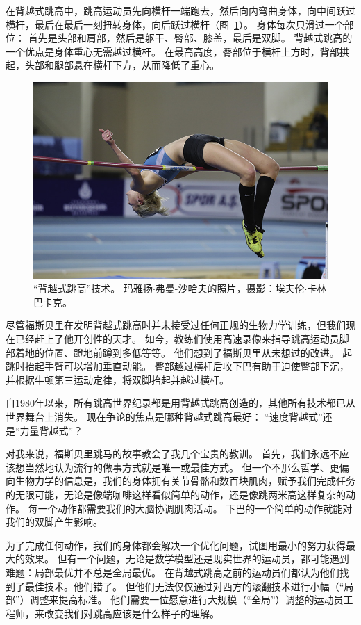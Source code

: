 在背越式跳高中，跳高运动员先向横杆一端跑去，然后向内弯曲身体，向中间跃过横杆，最后在最后一刻扭转身体，向后跃过横杆（图~\ref{fig:9_1}）。
身体每次只滑过一个部位：
首先是头部和肩部，然后是躯干、臀部、膝盖，最后是双脚。
背越式跳高的一个优点是身体重心无需越过横杆。
在最高高度，臀部位于横杆上方时，背部拱起，头部和腿部悬在横杆下方，从而降低了重心。


\begin{figure}[!htb]
	\centering
	\includegraphics[width=1.0\linewidth]{chap9/9_1}
	\caption{“背越式跳高”技术。
		玛雅扬$\cdot$弗曼-沙哈夫的照片，摄影：埃夫伦$\cdot$卡林巴卡克。 \label{fig:9_1}}
\end{figure}


尽管福斯贝里在发明背越式跳高时并未接受过任何正规的生物力学训练，但我们现在已经赶上了他开创性的天才。
如今，教练们使用高速录像来指导跳高运动员脚部着地的位置、蹬地前蹲到多低等等。
他们想到了福斯贝里从未想过的改进。
起跳时抬起手臂可以增加垂直动能。
臀部越过横杆后收下巴有助于迫使臀部下沉，并根据牛顿第三运动定律，将双脚抬起并越过横杆。


自1980年以来，所有跳高世界纪录都是用背越式跳高创造的，其他所有技术都已从世界舞台上消失。
现在争论的焦点是哪种背越式跳高最好：
“速度背越式”还是“力量背越式”？


对我来说，福斯贝里跳马的故事教会了我几个宝贵的教训。
首先，我们永远不应该想当然地认为流行的做事方式就是唯一或最佳方式。
但一个不那么哲学、更偏向生物力学的信息是，我们的身体拥有关节骨骼和数百块肌肉，赋予我们完成任务的无限可能，无论是像端咖啡这样看似简单的动作，还是像跳两米高这样复杂的动作。
每一个动作都需要我们的大脑协调肌肉活动。
下巴的一个简单的动作就能对我们的双脚产生影响。


为了完成任何动作，我们的身体都会解决一个优化问题，试图用最小的努力获得最大的效果。
但有一个问题，无论是数学模型还是现实世界的运动员，都可能遇到难题：局部最优并不总是全局最优。
在背越式跳高之前的运动员们都认为他们找到了最佳技术。他们错了。
但他们无法仅仅通过对西方的滚翻技术进行小幅（“局部”）调整来提高标准。
他们需要一位愿意进行大规模（“全局”）调整的运动员工程师，来改变我们对跳高应该是什么样子的理解。


